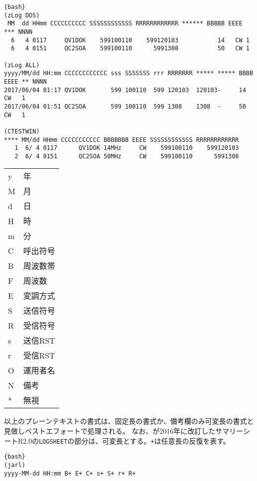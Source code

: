 \documentclass[10pt,a4paper]{book}
\begin{document}
\begin{table}[H]
\begin{minipage}{.85\hsize}
\begin{Verbatim}{bash}
(zLog DOS)
 MM  dd HHmm CCCCCCCCCC SSSSSSSSSSSS RRRRRRRRRRRR ****** BBBBB EEEE *** NNNN
  6   4 0117     QV1DOK    599100110    599120103           14   CW 1
  6   4 0151     QC2SOA    599100110      5991308           50   CW 1

(zLog ALL)
yyyy/MM/dd HH:mm CCCCCCCCCCCC sss SSSSSSS rrr RRRRRRR ***** ***** BBBB EEEE ** NNNN
2017/06/04 01:17 QV1DOK       599 100110  599 120103  120103-     14   CW   1
2017/06/04 01:51 QC2SOA       599 100110  599 1308    1308  -     50   CW   1

(CTESTWIN)
**** MM/dd HHmm CCCCCCCCCCC BBBBBBB EEEE SSSSSSSSSSSS RRRRRRRRRRRR
   1  6/ 4 0117      QV1DOK 14MHz     CW    599100110    599120103
   2  6/ 4 0151      QC2SOA 50MHz     CW    599100110      5991308
\end{Verbatim}
\end{minipage}
\begin{minipage}{.14\hsize}
\footnotesize
\begin{tabular}{Tl}
y & 年       \\
M & 月       \\
d & 日       \\
H & 時       \\
m & 分       \\
C & 呼出符号 \\
B & 周波数帯 \\
F & 周波数   \\
E & 変調方式 \\
S & 送信符号 \\
R & 受信符号 \\
s & 送信RST  \\
r & 受信RST  \\
O & 運用者名 \\
N & 備考     \\
* & 無視     \\
\end{tabular}
\end{minipage}
\end{table}

以上のプレーンテキストの書式は、固定長の書式か、備考欄のみ可変長の書式と見做しベストエフォートで処理される。
なお、\jarl{}が2016年に改訂したサマリーシートR2.0の\texttt{LOGSHEET}の部分は、可変長とする。\texttt{+}は任意長の反復を表す。

\begin{Verbatim}{bash}
(jarl)
yyyy-MM-dd HH:mm B+ E+ C+ s+ S+ r+ R+
\end{Verbatim}
\end{document}
